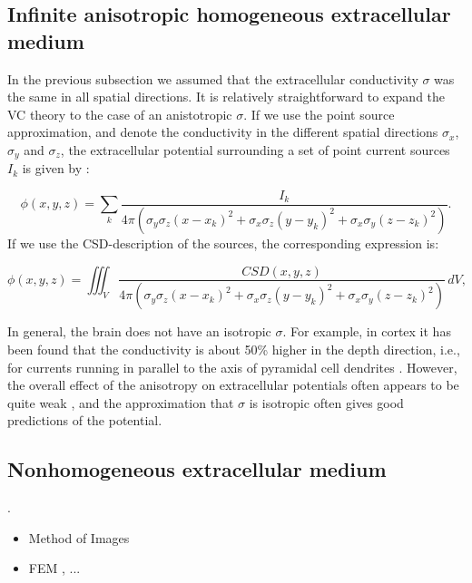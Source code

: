 \subsection{Infinite anisotropic homogeneous extracellular medium}
\label{sec:anisohomo}
In the previous subsection we assumed that the extracellular conductivity $\sigma$ was the same in all spatial directions. It is relatively straightforward to expand the VC theory to the case of an anistotropic $\sigma$. If we use the point source approximation, and denote the conductivity in the different spatial directions $\sigma_x$, $\sigma_y$ and $\sigma_z$, the extracellular potential surrounding a set of point current sources $I_k$ is given by \citep{nicholson1975, Pettersen2012}:

\begin{equation}
\phi(x,y,z) = \sum_k \frac{I_k}{4\pi(\sigma_y\sigma_z (x-x_k)^2 + \sigma_x\sigma_z (y-y_k)^2 + \sigma_x\sigma_y (z-z_k)^2)}.
\label{eq:Panisos}
\end{equation}
If we use the CSD-description of the sources, the corresponding expression is:

\begin{equation}
\phi(x,y,z) = \iiint_V \frac{CSD(x,y,z)}{4\pi(\sigma_y\sigma_z (x-x_k)^2 + \sigma_x\sigma_z (y-y_k)^2 + \sigma_x\sigma_y (z-z_k)^2)} \, dV, 
\label{eq:Canisos}
\end{equation}

In general, the brain does not have an isotropic $\sigma$. For example, in cortex it has been found that the conductivity is about 50\% higher in the depth direction, i.e., for currents running in parallel to the axis of pyramidal cell dendrites \citep{Goto2010}. However, the overall effect of the anisotropy on extracellular potentials often appears to be quite weak \citep{Ness2015}, and the approximation that $\sigma$ is isotropic often gives good predictions of the potential.


\subsection{Nonhomogeneous extracellular medium}
\label{sec:nonhomo}
. 

\begin{itemize}
\item Method of Images \citep{Ness2015}
\item FEM \citep{Ness2015}, ...
\end{itemize}


